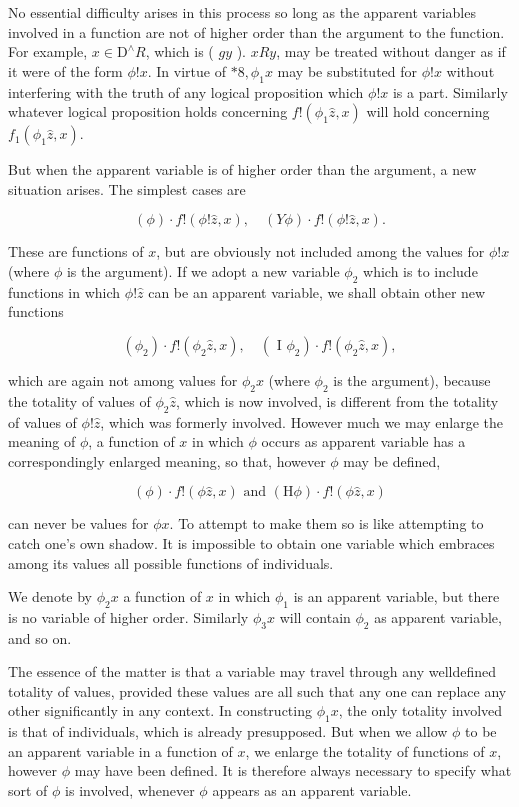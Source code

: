 \documentclass[10pt]{article}
\begin{document}
No essential difficulty arises in this process so long as the apparent variables involved in a function are not of higher order than the argument to the function. For example, $x \in \mathrm{D}^{\wedge} R$, which is ( $g y$ ). $x R y$, may be treated without danger as if it were of the form $\phi!x$. In virtue of $* 8, \phi_{1} x$ may be substituted for $\phi!x$ without interfering with the truth of any logical proposition which $\phi!x$ is a part. Similarly whatever logical proposition holds concerning $f!\left(\phi_{1} \hat{z}, x\right)$ will hold concerning $f_{1}\left(\phi_{1} \hat{z}, x\right)$.

But when the apparent variable is of higher order than the argument, a new situation arises. The simplest cases are

$$
(\phi) \cdot f!(\phi!\hat{z}, x), \quad(Y \phi) \cdot f!(\phi!\hat{z}, x) .
$$

These are functions of $x$, but are obviously not included among the values for $\phi!x$ (where $\phi$ is the argument). If we adopt a new variable $\phi_{2}$ which is to include functions in which $\phi!\hat{z}$ can be an apparent variable, we shall obtain other new functions

$$
\left(\phi_{2}\right) \cdot f!\left(\phi_{2} \hat{z}, x\right), \quad\left(\text { I } \phi_{2}\right) \cdot f!\left(\phi_{2} \hat{z}, x\right),
$$

which are again not among values for $\phi_{2} x$ (where $\phi_{2}$ is the argument), because the totality of values of $\phi_{2} \hat{z}$, which is now involved, is different from the totality of values of $\phi!\hat{z}$, which was formerly involved. However much we may enlarge the meaning of $\phi$, a function of $x$ in which $\phi$ occurs as apparent variable has a correspondingly enlarged meaning, so that, however $\phi$ may be defined,

$$
(\phi) \cdot f!(\phi \hat{z}, x) \text { and }(\mathrm{H} \phi) \cdot f!(\phi \hat{z}, x)
$$

can never be values for $\phi x$. To attempt to make them so is like attempting to catch one's own shadow. It is impossible to obtain one variable which embraces among its values all possible functions of individuals.

We denote by $\phi_{2} x$ a function of $x$ in which $\phi_{1}$ is an apparent variable, but there is no variable of higher order. Similarly $\phi_{3} x$ will contain $\phi_{2}$ as apparent variable, and so on.

The essence of the matter is that a variable may travel through any welldefined totality of values, provided these values are all such that any one can replace any other significantly in any context. In constructing $\phi_{1} x$, the only totality involved is that of individuals, which is already presupposed. But when we allow $\phi$ to be an apparent variable in a function of $x$, we enlarge the totality of functions of $x$, however $\phi$ may have been defined. It is therefore always necessary to specify what sort of $\phi$ is involved, whenever $\phi$ appears as an apparent variable.
\end{document}
